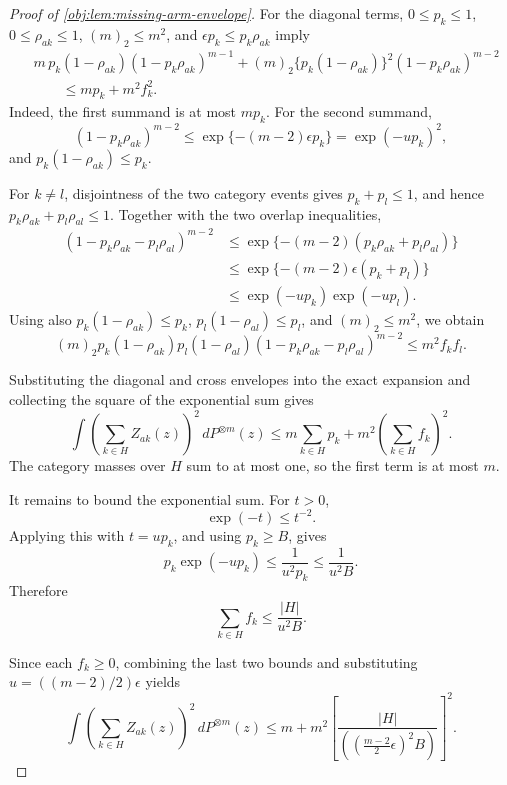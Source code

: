 \begin{proof}[Proof of \cref{obj:lem:missing-arm-envelope}]
For the diagonal terms, \(0\le p_k\le1\), \(0\le\rho_{ak}\le1\), \((m)_2\le m^2\), and
\(\epsilon p_k\le p_k\rho_{ak}\) imply
\[
\begin{aligned}
&m\,p_k(1-\rho_{ak})(1-p_k\rho_{ak})^{m-1}
+
(m)_2\{p_k(1-\rho_{ak})\}^2(1-p_k\rho_{ak})^{m-2}
\\
&\qquad\le
m p_k+m^2 f_k^2 .
\end{aligned}
\]
Indeed, the first summand is at most \(m p_k\). For the second summand,
\[
(1-p_k\rho_{ak})^{m-2}
\le
\exp\{-(m-2)\epsilon p_k\}
=
\exp(-up_k)^2,
\]
and \(p_k(1-\rho_{ak})\le p_k\). %

For \(k\ne l\), disjointness of the two category events gives \(p_k+p_l\le1\), and hence
\(p_k\rho_{ak}+p_l\rho_{al}\le1\). Together with the two overlap inequalities,
\[
\begin{aligned}
(1-p_k\rho_{ak}-p_l\rho_{al})^{m-2}
&\le
\exp\{-(m-2)(p_k\rho_{ak}+p_l\rho_{al})\}
\\
&\le
\exp\{-(m-2)\epsilon(p_k+p_l)\}
\\
&\le
\exp(-up_k)\exp(-up_l).
\end{aligned}
\]
Using also \(p_k(1-\rho_{ak})\le p_k\), \(p_l(1-\rho_{al})\le p_l\), and \((m)_2\le m^2\), we obtain
\[
(m)_2 p_k(1-\rho_{ak})p_l(1-\rho_{al})
(1-p_k\rho_{ak}-p_l\rho_{al})^{m-2}
\le
m^2 f_kf_l .
\]

Substituting the diagonal and cross envelopes into the exact expansion and collecting the square of the
exponential sum gives
\[
\int \left(\sum_{k\in H}Z_{ak}(z)\right)^2\,dP^{\otimes m}(z)
\le
m\sum_{k\in H}p_k
+
m^2\left(\sum_{k\in H}f_k\right)^2 .
\]
The category masses over \(H\) sum to at most one, so the first term is at most \(m\). %

It remains to bound the exponential sum. For \(t>0\),
\[
\exp(-t)\le t^{-2}.
\]
Applying this with \(t=up_k\), and using \(p_k\ge B\), gives
\[
p_k\exp(-up_k)
\le
\frac{1}{u^2p_k}
\le
\frac{1}{u^2B}.
\]
Therefore
\[
\sum_{k\in H}f_k
\le
\frac{|H|}{u^2B}.
\]

Since each \(f_k\ge0\), combining the last two bounds and substituting
\(u=((m-2)/2)\epsilon\) yields
\[
\int \left(\sum_{k\in H}Z_{ak}(z)\right)^2\,dP^{\otimes m}(z)
\le
m+m^2
\left[
\frac{|H|}
{\left(\left(\frac{m-2}{2}\epsilon\right)^2B\right)}
\right]^2 .
\]
\end{proof}
